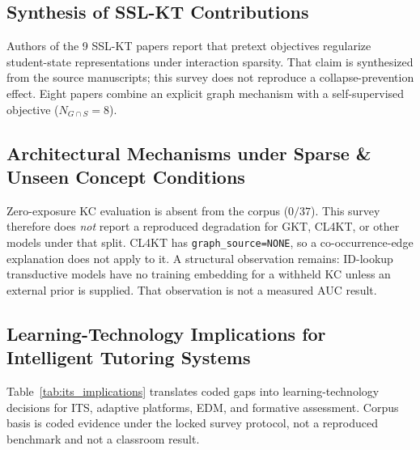 \documentclass[lettersize,journal]{IEEEtran}
\begin{document}
\subsection{Synthesis of SSL-KT Contributions}
Authors of the 9 SSL-KT papers report that pretext objectives regularize student-state representations under interaction sparsity. That claim is synthesized from the source manuscripts; this survey does not reproduce a collapse-prevention effect. Eight papers combine an explicit graph mechanism with a self-supervised objective ($N_{G \cap S} = 8$).

\subsection{Architectural Mechanisms under Sparse \& Unseen Concept Conditions}
Zero-exposure KC evaluation is absent from the corpus ($0/37$). This survey therefore does \emph{not} report a reproduced degradation for GKT, CL4KT, or other models under that split. CL4KT has \texttt{graph\_source=NONE}, so a co-occurrence-edge explanation does not apply to it. A structural observation remains: ID-lookup transductive models have no training embedding for a withheld KC unless an external prior is supplied. That observation is not a measured AUC result.

\subsection{Learning-Technology Implications for Intelligent Tutoring Systems}
Table~\ref{tab:its_implications} translates coded gaps into learning-technology decisions for ITS, adaptive platforms, EDM, and formative assessment. Corpus basis is coded evidence under the locked survey protocol, not a reproduced benchmark and not a classroom result.
\end{document}

